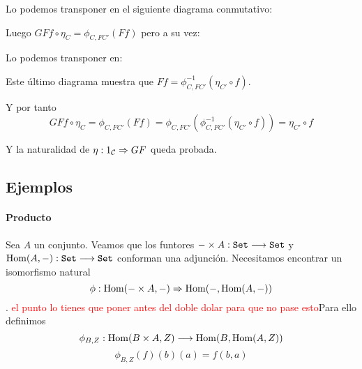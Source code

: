 \begin{center}
\end{center}

Lo podemos transponer en el siguiente diagrama conmutativo:

\begin{center}
\end{center}

Luego $GFf \circ \eta_C = \phi_{C, FC'}(Ff)$ pero a su vez:


\begin{center}
\end{center}

Lo podemos transponer en:

\begin{center}
\end{center}

Este último diagrama muestra que
$Ff = \phi^{-1}_{C, FC'}(\eta_{C'} \circ f)$.


Y por tanto
$$GFf \circ \eta_C = \phi_{C, FC'}(Ff) = \phi_{C, FC'}
  (\phi^{-1}_{C,FC'}(\eta_{C'} \circ f)) = \eta_{C'} \circ f$$

Y la naturalidad de $\eta : 1_{\mathcal{C}}\Rightarrow GF$ queda probada.

\subsection{Ejemplos}
\paragraph{Producto}
Sea $A$ un conjunto. Veamos que los funtores
$-\times A : \texttt{Set}\longrightarrow \texttt{Set}$ y
$\operatorname{Hom}(A, -) : \texttt{Set}\longrightarrow \texttt{Set}$ conforman una adjunción.
Necesitamos encontrar un isomorfismo natural
$$\phi : \operatorname{Hom}(-\times A, -)\Rightarrow \operatorname{Hom}(-, \operatorname{Hom}(A, -))$$.
\textcolor{red}{el punto lo tienes que poner antes del doble dolar para que no pase esto}Para ello definimos
$$\phi_{B, Z} : \operatorname{Hom}(B\times A, Z)\longrightarrow \operatorname{Hom}(B, \operatorname{Hom}(A, Z))$$
$$\phi_{B, Z}(f)(b)(a) = f(b, a)$$

